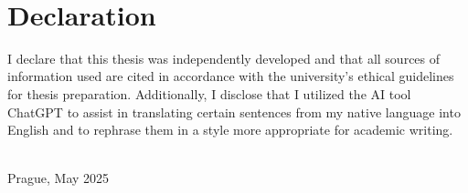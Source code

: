 ~\vfill{}

\section*{Declaration}

I declare that this thesis was independently developed and that all sources of information used are cited in accordance with the university's ethical guidelines for thesis preparation. Additionally, I disclose that I utilized the AI tool ChatGPT to assist in translating certain sentences from my native language into English and to rephrase them in a style more appropriate for academic writing.

\vspace{1.5cm}
~\\

Prague, May 2025

\hfill{}~~~~~~~~~~~~~~~

\newpage{}
